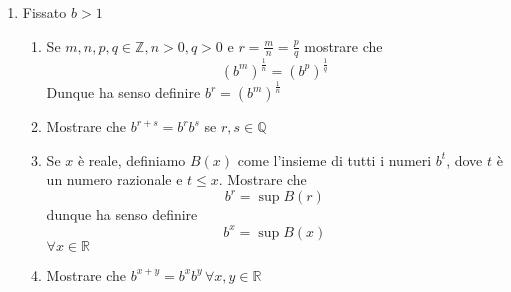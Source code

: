 \documentclass{report}
\begin{document}
\begin{enumerate}[resume, label=\protect\circled{\arabic*}]
	\item Fissato $b>1$ \begin{enumerate}
		\item Se $m, n, p, q \in \mathbb{Z}, n>0, q>0$ e $r=\frac{m}{n} = \frac{p}{q}$ mostrare che
		$$
			(b^m)^{\frac{1}{n}} = (b^p)^{\frac{1}{q}}
 		$$
 		Dunque ha senso definire $b^r = (b^m)^{\frac{1}{n}}$
 		\item Mostrare che $b^{r+s} = b^r b^s$ se $r, s \in \mathbb{Q}$
 		\item Se $x$ è reale, definiamo $B(x)$ come l'insieme di tutti i numeri $b^t$, dove $t$ è un numero razionale e $t \leq x$. Mostrare che
 		$$
 			b^r = \sup{B(r)}
 		$$
 		dunque ha senso definire
 		$$
 		b^x = \sup{B(x)}
 		$$
 		$\forall x \in \mathbb{R}$
 		\item Mostrare che $b^{x+y}=b^x b^y \, \forall x, y \in \mathbb{R}$
	\end{enumerate}
\end{enumerate}
\end{document}

